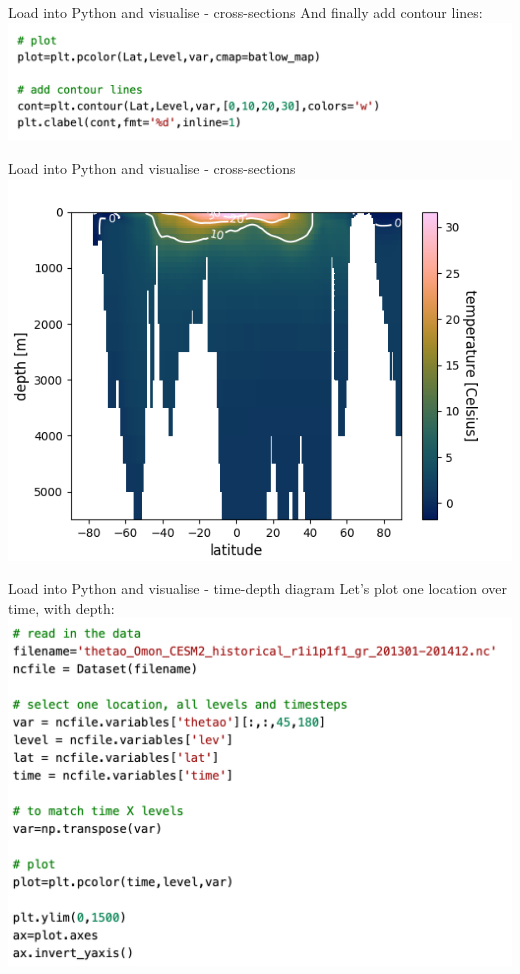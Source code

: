 \begin{frame}{\insertsectionnumber{ |} Load into Python and visualise - cross-sections}
    And finally add contour lines:\\
    \includegraphics[scale=0.35]{images/Script2_step4.png}\\
\end{frame}


\begin{frame}{\insertsectionnumber{ |} Load into Python and visualise - cross-sections}
    \includegraphics[scale=0.45]{images/script1_fig9.png}
\end{frame}


\begin{frame}{\insertsectionnumber{ |} Load into Python and visualise - time-depth diagram} 
    Let's plot one location over time, with depth: \\
    \hbox{\hspace{-0.5cm}\includegraphics[scale=0.35]{images/Script3_step1.png}}
\end{frame}



